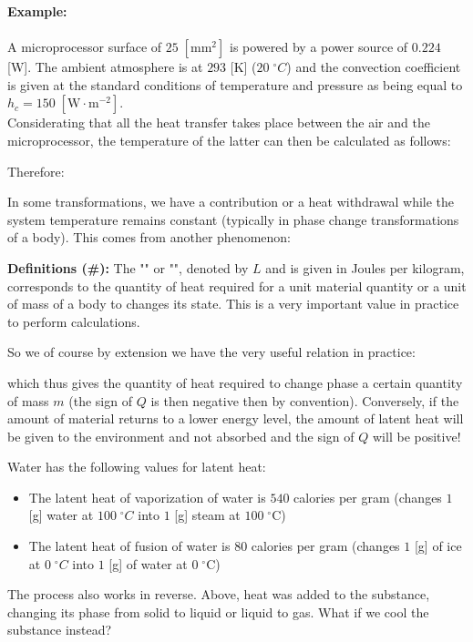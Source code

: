 	\begin{tcolorbox}[colframe=black,colback=white,sharp corners]
	\textbf{{\Large {}}Example:}\\\\
	A microprocessor surface of $25\; [\text{mm}^2]$ is powered by a power source of $0.224$ [W]. The ambient atmosphere is at $293$ [K] ($20\; ^\circ C$) and the convection coefficient is given at the standard conditions of temperature and pressure as being equal to $h_c=150\;[\text{W}\cdot\text{m}^{-2}]$. \\

	Considerating that all the heat transfer takes place between the air and the microprocessor, the temperature of the latter can then be calculated as follows:
	
	Therefore:
	
	\end{tcolorbox}
	In some transformations, we have a contribution or a heat withdrawal while the system temperature remains constant (typically in phase change transformations of a body). This comes from another phenomenon:

	\textbf{Definitions (\#\mydef):} The "" or "", denoted by $L$ and is given in Joules per kilogram, corresponds to the quantity of heat required for a unit material quantity or a unit of mass of a body to changes its state. This is a very important value in practice to perform calculations.

	So we of course by extension we have the very useful relation in practice:
	
	which thus gives the quantity of heat required to change phase  a certain quantity of mass $m$ (the sign of $Q$ is then negative then by convention). Conversely, if the amount of material returns to a lower energy level, the amount of latent heat will be given to the environment and not absorbed and the sign of $Q$ will be positive! 
	
	Water has the following values for latent heat:
	\begin{itemize}
		\item The latent heat of vaporization of water is $540$ calories per gram (changes $1$ [g] water at $100\;^\circ C$ into $1$ [g] steam at $100\;^\circ\text{C}$)

		\item The latent heat of fusion of water is $80$ calories per gram (changes $1$ [g] of ice at $0\;^\circ C$ into $1$ [g] of water at $0\;^\circ \text{C}$)
	\end{itemize}
	The process also works in reverse.  Above, heat was added to the substance, changing its phase from solid to liquid or liquid to gas.  What if we cool the substance instead?

